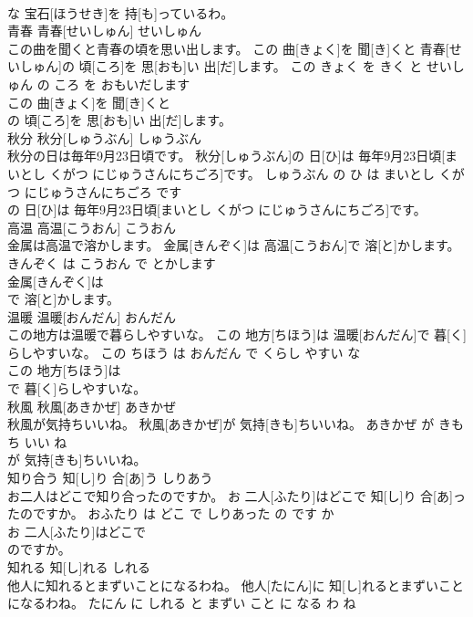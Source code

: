 \documentclass[8pt]{extreport}
\begin{document}
\begin{CJK}{UTF8}{min}
\\	な 宝石[ほうせき]を 持[も]っているわ。			
\\	青春	青春[せいしゅん]	せいしゅん	
\\	この曲を聞くと青春の頃を思い出します。	この 曲[きょく]を 聞[き]くと 青春[せいしゅん]の 頃[ころ]を 思[おも]い 出[だ]します。	この きょく を きく と せいしゅん の ころ を おもいだします	
\\	この 曲[きょく]を 聞[き]くと
\\	の 頃[ころ]を 思[おも]い 出[だ]します。			
\\	秋分	秋分[しゅうぶん]	しゅうぶん	
\\	秋分の日は毎年9月23日頃です。	秋分[しゅうぶん]の 日[ひ]は 毎年9月23日頃[まいとし くがつ にじゅうさんにちごろ]です。	しゅうぶん の ひ は まいとし くがつ にじゅうさんにちごろ です	
\\	の 日[ひ]は 毎年9月23日頃[まいとし くがつ にじゅうさんにちごろ]です。			
\\	高温	高温[こうおん]	こうおん	
\\	金属は高温で溶かします。	金属[きんぞく]は 高温[こうおん]で 溶[と]かします。	きんぞく は こうおん で とかします	
\\	金属[きんぞく]は
\\	で 溶[と]かします。			
\\	温暖	温暖[おんだん]	おんだん	
\\	この地方は温暖で暮らしやすいな。	この 地方[ちほう]は 温暖[おんだん]で 暮[く]らしやすいな。	この ちほう は おんだん で くらし やすい な	
\\	この 地方[ちほう]は
\\	で 暮[く]らしやすいな。			
\\	秋風	秋風[あきかぜ]	あきかぜ	
\\	秋風が気持ちいいね。	秋風[あきかぜ]が 気持[きも]ちいいね。	あきかぜ が きもち いい ね	
\\	が 気持[きも]ちいいね。			
\\	知り合う	知[し]り 合[あ]う	しりあう	
\\	お二人はどこで知り合ったのですか。	お 二人[ふたり]はどこで 知[し]り 合[あ]ったのですか。	おふたり は どこ で しりあった の です か	
\\	お 二人[ふたり]はどこで
\\	のですか。			
\\	知れる	知[し]れる	しれる	
\\	他人に知れるとまずいことになるわね。	他人[たにん]に 知[し]れるとまずいことになるわね。	たにん に しれる と まずい こと に なる わ ね	

\end{CJK}
\end{document}
